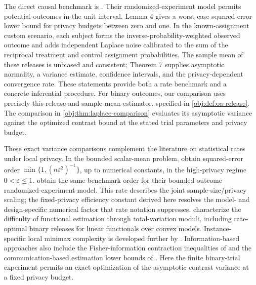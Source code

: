 The direct causal benchmark is \citet[Sections 3.1 and 3.3, Lemma 4, Theorem 7, and Appendix A.5]{OhnishiAwan2025}. Their randomized-experiment model permits potential outcomes in the unit interval. Lemma 4 gives a worst-case squared-error lower bound for privacy budgets between zero and one. In the known-assignment custom scenario, each subject forms the inverse-probability-weighted observed outcome and adds independent Laplace noise calibrated to the sum of the reciprocal treatment and control assignment probabilities. The sample mean of these releases is unbiased and consistent; Theorem 7 supplies asymptotic normality, a variance estimate, confidence intervals, and the privacy-dependent convergence rate. These statements provide both a rate benchmark and a concrete inferential procedure. %
For binary outcomes, our comparison uses precisely this release and sample-mean estimator, specified in \cref{obj:def:oa-release}. The comparison in \cref{obj:thm:laplace-comparison} evaluates its asymptotic variance against the optimized contrast bound at the stated trial parameters and privacy budget.

These exact variance comparisons complement the literature on statistical rates under local privacy. In the bounded scalar-mean problem, \citet[Section 3.2.1]{DuchiJordanWainwright2018} obtain squared-error order \(\min\{1,(n\varepsilon^2)^{-1}\}\), up to numerical constants, in the high-privacy regime \(0<\varepsilon\le1\).  obtain the same benchmark order for their bounded-outcome randomized-experiment model. This rate describes the joint sample-size/privacy scaling; the fixed-privacy efficiency constant derived here resolves the model- and design-specific numerical factor that rate notation suppresses.  characterize the difficulty of functional estimation through total-variation moduli, including rate-optimal binary releases for linear functionals over convex models. Instance-specific local minimax complexity is developed further by \citet{Duchi2024}. %
Information-based approaches also include the Fisher-information contraction inequalities of \citet{BarnesChenOzgur2020} and the communication-based estimation lower bounds of \citet{Duchi2019}. %
Here the finite binary-trial experiment permits an exact optimization of the asymptotic contrast variance at a fixed privacy budget.

